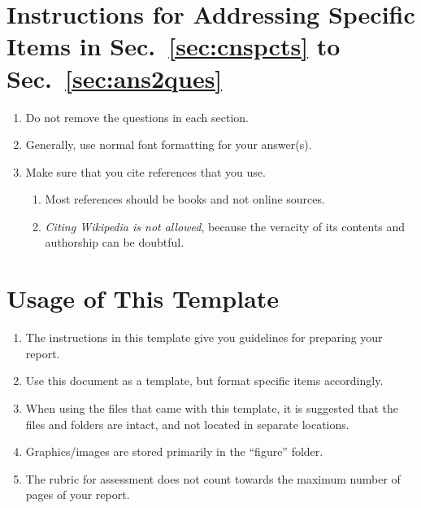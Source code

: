 \appendices

\section{Instructions for Addressing Specific Items in Sec.~\ref{sec:cnspcts} to Sec.~\ref{sec:ans2ques}}

\begin{enumerate}

	\item Do not remove the questions in each section.
	
	\item Generally, use normal font formatting for your answer(s).

	\item Make sure that you cite references that you use. 
		
	\begin{enumerate}
		\item  Most references should be books and not online sources. 
		
		\item \emph{Citing Wikipedia is not allowed}, because the veracity of its contents and authorship can be doubtful.
	\end{enumerate}
	
\end{enumerate}





\section{Usage of This Template}

\begin{enumerate}
	\item The instructions in this template give you guidelines for preparing your report.

	\item Use this document as a template, but format specific items accordingly.
	
	\item When using the files that came with this template, it is suggested that the files and folders are intact, and not located in separate locations.  
	
	\item Graphics/images are stored primarily in the ``figure'' folder. 
	
	\item The rubric for assessment does not count towards the maximum number of pages of your report.
\end{enumerate}




